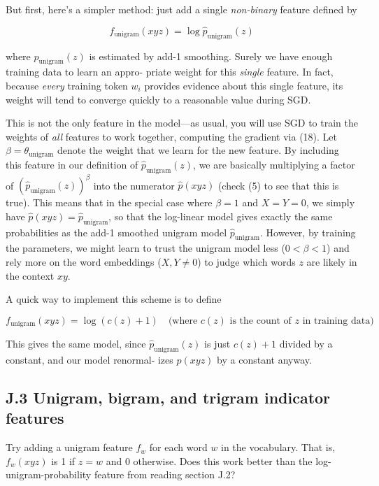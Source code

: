 \documentclass[12pt]{article}
\theoremstyle{plain}
\theoremstyle{definition}
\theoremstyle{remark}
\begin{document}
But first, here’s a simpler method: just add a single \emph{non-binary} feature defined by 

\[
f_{\text{unigram}}(xyz) = \log \hat{p}_{\text{unigram}}(z) \tag{26}
\]

where $\hat{p}_{\text{unigram}}(z)$ is estimated by add-1 smoothing. Surely we have enough training data to learn an appro-
priate weight for this \emph{single} feature. In fact, because \emph{every} training token $w_i$ provides evidence about this 
single feature, its weight will tend to converge quickly to a reasonable value during SGD. 

This is not the only feature in the model—as usual, you will use SGD to train the weights of \emph{all} features 
to work together, computing the gradient via (18). Let $\beta = \theta_{\text{unigram}}$ denote the weight that we learn for 
the new feature. By including this feature in our definition of $\hat{p}_{\text{unigram}}(z)$, we are basically multiplying a 
factor of $(\hat{p}_{\text{unigram}}(z))^\beta$ into the numerator $\hat{p}(xyz)$ (check (5) to see that this is true). This means that in the 
special case where $\beta = 1$ and $X = Y = 0$, we simply have $\hat{p}(xyz) = \hat{p}_{\text{unigram}}$, so that the log-linear model 
gives exactly the same probabilities as the add-1 smoothed unigram model $\hat{p}_{\text{unigram}}$. However, by training 
the parameters, we might learn to trust the unigram model less ($0 < \beta < 1$) and rely more on the word 
embeddings ($X, Y \neq 0$) to judge which words $z$ are likely in the context $xy$. 

A quick way to implement this scheme is to define 

\[
f_{\text{unigram}}(xyz) = \log(c(z) + 1) \quad \text{(where $c(z)$ is the count of $z$ in training data)} \tag{27}
\]

This gives the same model, since $\hat{p}_{\text{unigram}}(z)$ is just $c(z)+1$ divided by a constant, and our model renormal-
izes $\hat{p}(xyz)$ by a constant anyway. 

\subsection*{J.3 Unigram, bigram, and trigram indicator features}

Try adding a unigram feature $f_w$ for each word $w$ in the vocabulary. That is, $f_w(xyz)$ is 1 if $z=w$ and 0 
otherwise. Does this work better than the log-unigram-probability feature from reading section J.2? 
\end{document}
